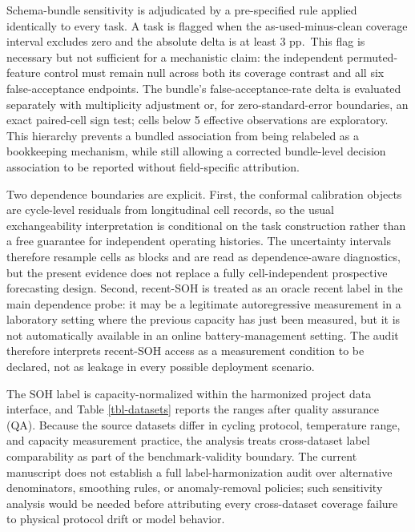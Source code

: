 \documentclass[
  number,
  preprint]{elsarticle}
\begin{document}
Schema-bundle sensitivity is adjudicated by a pre-specified rule applied
identically to every task. A task is flagged when the
as-used-minus-clean coverage interval excludes zero and the absolute
delta is at least 3 pp.~This flag is necessary but not sufficient for a
mechanistic claim: the independent permuted-feature control must remain
null across both its coverage contrast and all six false-acceptance
endpoints. The bundle's false-acceptance-rate delta is evaluated
separately with multiplicity adjustment or, for zero-standard-error
boundaries, an exact paired-cell sign test; cells below 5 effective
observations are exploratory. This hierarchy prevents a bundled
association from being relabeled as a bookkeeping mechanism, while still
allowing a corrected bundle-level decision association to be reported
without field-specific attribution.

Two dependence boundaries are explicit. First, the conformal calibration
objects are cycle-level residuals from longitudinal cell records, so the
usual exchangeability interpretation is conditional on the task
construction rather than a free guarantee for independent operating
histories. The uncertainty intervals therefore resample cells as blocks
and are read as dependence-aware diagnostics, but the present evidence
does not replace a fully cell-independent prospective forecasting
design. Second, recent-SOH is treated as an oracle recent label in the
main dependence probe: it may be a legitimate autoregressive measurement
in a laboratory setting where the previous capacity has just been
measured, but it is not automatically available in an online
battery-management setting. The audit therefore interprets recent-SOH
access as a measurement condition to be declared, not as leakage in
every possible deployment scenario.

The SOH label is capacity-normalized within the harmonized project data
interface, and Table \ref{tbl-datasets} reports the ranges after quality
assurance (QA). Because the source datasets differ in cycling protocol,
temperature range, and capacity measurement practice, the analysis
treats cross-dataset label comparability as part of the
benchmark-validity boundary. The current manuscript does not establish a
full label-harmonization audit over alternative denominators, smoothing
rules, or anomaly-removal policies; such sensitivity analysis would be
needed before attributing every cross-dataset coverage failure to
physical protocol drift or model behavior.
\end{document}
